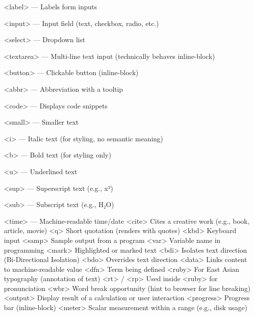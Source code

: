 <label> — Labels form inputs

<input> — Input field (text, checkbox, radio, etc.)

<select> — Dropdown list

<textarea> — Multi-line text input (technically behaves inline-block)

<button> — Clickable button (inline-block)

<abbr> — Abbreviation with a tooltip

<code> — Displays code snippets

<small> — Smaller text

<i> — Italic text (for styling, no semantic meaning)

<b> — Bold text (for styling only)

<u> — Underlined text

<sup> — Superscript text (e.g., x²)

<sub> — Subscript text (e.g., H₂O)

<time> — Machine-readable time/date
<cite>	Cites a creative work (e.g., book, article, movie)
<q>	Short quotation (renders with quotes)
<kbd>	Keyboard input
<samp>	Sample output from a program
<var>	Variable name in programming
<mark>	Highlighted or marked text
<bdi>	Isolates text direction (Bi-Directional Isolation)
<bdo>	Overrides text direction
<data>	Links content to machine-readable value
<dfn>	Term being defined
<ruby>	For East Asian typography (annotation of text)
<rt> / <rp>	Used inside <ruby> for pronunciation
<wbr>	Word break opportunity (hint to browser for line breaking)
<output>	Display result of a calculation or user interaction
<progress>	Progress bar (inline-block)
<meter>	Scalar measurement within a range (e.g., disk usage)


